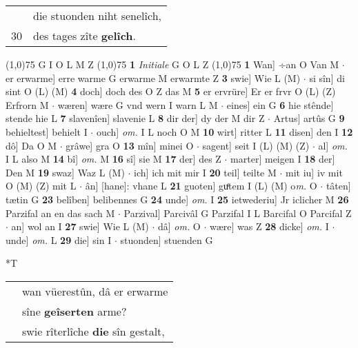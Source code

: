 \documentclass[8pt,a4paper,notitlepage]{article}
\begin{document}
\begin{table}[ht]
\begin{minipage}[t]{0.5\linewidth}
\begin{tabular}{rl}
 & die stuonden niht senelîch,\\ 
30 & des tages zîte \textbf{gelîch}.\\ 
\end{tabular}
\scriptsize
\line(1,0){75} \newline
G I O L M Z \newline
\line(1,0){75} \newline
\textbf{1} \textit{Initiale} G O L Z  \newline
\line(1,0){75} \newline
\textbf{1} Wan] ÷an O Van M  $\cdot$ er erwarme] erre warme G erwarme M erwarmte Z \textbf{3} swie] Wie L (M)  $\cdot$ si sîn] di sint O (L) (M) \textbf{4} doch] doch des O Z das M \textbf{5} er ervrüre] Er er frvr O (L) (Z) Erfrorn M  $\cdot$ wæren] wære G vnd wern I warn L M  $\cdot$ eines] ein G \textbf{6} hie stênde] stende hie L \textbf{7} slavenîen] slavenie L \textbf{8} dir der] dy der M dir Z  $\cdot$ Artus] artûs G \textbf{9} behieltest] behielt I  $\cdot$ ouch] \textit{om.} I L noch O M \textbf{10} wirt] ritter L \textbf{11} disen] den I \textbf{12} dô] Da O M  $\cdot$ grâwe] gra O \textbf{13} mîn] minei O  $\cdot$ sagent] seit I (L) (M) (Z)  $\cdot$ al] \textit{om.} I L also M \textbf{14} bî] \textit{om.} M \textbf{16} sî] sie M \textbf{17} der] des Z  $\cdot$ marter] meigen I \textbf{18} der] Den M \textbf{19} swaz] Waz L (M)  $\cdot$ ich] ich mit mir I \textbf{20} teil] teilte M  $\cdot$ mit iu] iv mit O (M) (Z) mit L  $\cdot$ ân] [hane]: vhane L \textbf{21} guoten] guͤtem I (L) (M) o\textit{m. } O  $\cdot$ tâten] tætin G \textbf{23} belîben] belibennes G \textbf{24} unde] \textit{om.} I \textbf{25} ietwederiu] Jr iclicher M \textbf{26} Parzifal an en das sach M  $\cdot$ Parzival] Parcivâl G Parzifal I L Barcifal O Parcifal Z  $\cdot$ an] wol an I \textbf{27} swie] Wie L (M)  $\cdot$ dâ] \textit{om.} O  $\cdot$ wære] was Z \textbf{28} dicke] \textit{om.} I  $\cdot$ unde] \textit{om.} L \textbf{29} die] sin I  $\cdot$ stuonden] stuenden G \newline
\end{minipage}
\hspace{0.5cm}
\begin{minipage}[t]{0.5\linewidth}
\small
\begin{center}*T
\end{center}
\begin{tabular}{rl}
 & wan vüerestûn, dâ er erwarme\\ 
 & sîne \textbf{geîserten} arme?\\ 
 & swie rîterlîche \textbf{die} sîn gestalt,\\ 

\end{tabular}
\end{minipage}
\end{table}
\end{document}
